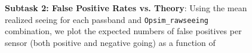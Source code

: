 \documentclass[DM,toc]{lsstdoc}
\begin{document}




\begin{figure}[!h]
  \centering
   \\
   \\
  \caption{{\bf Subtask 2: False Positive Rates vs. Theory}: Using the
    mean realized seeing for each passband and {\tt Opsim\_rawseeing}
    combination, we plot the expected numbers of false positives per
    sensor (both positive and negative going) as a function of
}
\end{figure}
\end{document}
